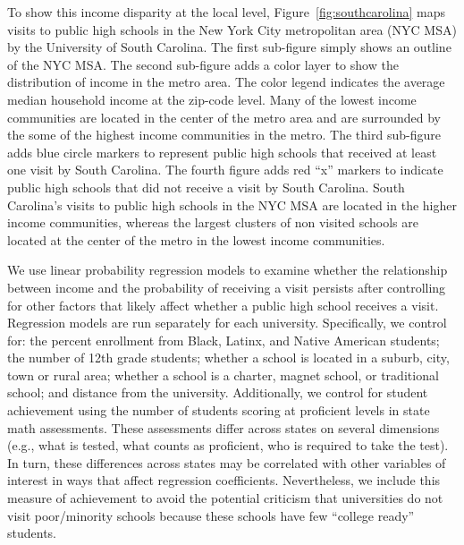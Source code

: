 \documentclass[twoside]{article}
\begin{document}
To show this income disparity at the local level, Figure~\ref{fig:southcarolina} maps visits to public high schools in the New York City metropolitan area (NYC MSA) by the University of South Carolina. The first sub-figure simply shows an outline of the NYC MSA. The second sub-figure adds a color layer to show the distribution of income in the metro area. The color legend indicates the average median household income at the zip-code level. Many of the lowest income communities are located in the center of the metro area and are surrounded by the some of the highest income communities in the metro. The third sub-figure adds blue circle markers to represent public high schools that received at least one visit by South Carolina. The fourth figure adds red ``x'' markers to indicate public high schools that did not receive a visit by South Carolina.  South Carolina's visits to public high schools in the NYC MSA are located in the higher income communities, whereas the largest clusters of non visited schools are located at the center of the metro in the lowest income communities.

We use linear probability regression models to examine whether the relationship between income and the probability of receiving a visit persists after controlling for other factors that likely affect whether a public high school receives a visit. Regression models are run separately for each university. Specifically, we control for: the percent enrollment from Black, Latinx, and Native American students; the number of 12th grade students; whether a school is located in a suburb, city, town or rural area; whether a school is a charter, magnet school, or traditional school; and distance from the university. Additionally, we control for student achievement using the number of students scoring at proficient levels in state math assessments. These assessments differ across states on several dimensions (e.g., what is tested, what counts as proficient, who is required to take the test). In turn, these differences across states may be correlated with other variables of interest in ways that affect regression coefficients. Nevertheless, we include this measure of achievement to avoid the potential criticism that universities do not visit poor/minority schools because these schools have few ``college ready'' students.
\end{document}
